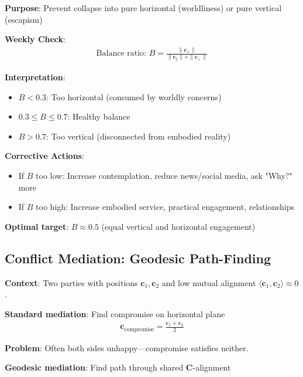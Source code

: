 \documentclass[11pt,a4paper]{article}
\theoremstyle{definition}
\theoremstyle{remark}
\newcommand{\cc}{\mathbf{c}}
\begin{document}
\begin{enumerate}
\begin{protocol}
\textbf{Purpose}: Prevent collapse into pure horizontal (worldliness) or pure vertical (escapism)

\textbf{Weekly Check}:
\begin{align}
\text{Balance ratio: } B = \frac{\|\cc_\perp\|}{\|\cc_\parallel\| + \|\cc_\perp\|}
\end{align}

\textbf{Interpretation}:
\begin{itemize}
    \item \(B < 0.3\): Too horizontal (consumed by worldly concerns)
    \item \(0.3 \leq B \leq 0.7\): Healthy balance
    \item \(B > 0.7\): Too vertical (disconnected from embodied reality)
\end{itemize}

\textbf{Corrective Actions}:
\begin{itemize}
    \item If \(B\) too low: Increase contemplation, reduce news/social media, ask "Why?" more
    \item If \(B\) too high: Increase embodied service, practical engagement, relationships
\end{itemize}

\textbf{Optimal target}: \(B \approx 0.5\) (equal vertical and horizontal engagement)
\end{protocol}

\subsection{Conflict Mediation: Geodesic Path-Finding}

\begin{protocol}
\textbf{Context}: Two parties with positions \(\cc_1, \cc_2\) and low mutual alignment \(\langle \cc_1, \cc_2 \rangle \approx 0\).

\textbf{Standard mediation}: Find compromise on horizontal plane
\begin{align}
\cc_{\text{compromise}} = \frac{\cc_1 + \cc_2}{2}
\end{align}

\textbf{Problem}: Often both sides unhappy—compromise satisfies neither.

\textbf{Geodesic mediation}: Find path through shared \(\mathbf{C}\)-alignment


\end{protocol}
\end{enumerate}
\end{document}

